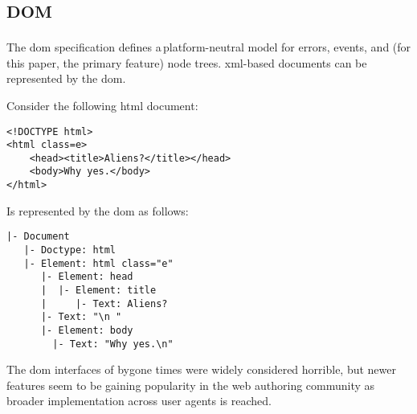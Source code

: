 
\chapter{\textsc{dom}}\label{appendix-dom}

The \gls{dom} specification defines a\,platform-neutral model for errors,
  events, and (for this paper, the primary feature) node trees.
\acrshort{xml}-based documents can be represented by the \gls{dom}.

Consider the following \gls{html} document:

\begin{lstlisting}
<!DOCTYPE html>
<html class=e>
    <head><title>Aliens?</title></head>
    <body>Why yes.</body>
</html>
\end{lstlisting}

\noindent Is represented by the \gls{dom} as follows:

\begin{lstlisting}
|- Document
   |- Doctype: html
   |- Element: html class="e"
      |- Element: head
      |  |- Element: title
      |     |- Text: Aliens?
      |- Text: "\n "
      |- Element: body
        |- Text: "Why yes.\n"
\end{lstlisting}

\noindent The \gls{dom} interfaces of bygone times were widely considered
  horrible, but newer features seem to be gaining popularity in the web
  authoring community as broader implementation across user agents is reached.
